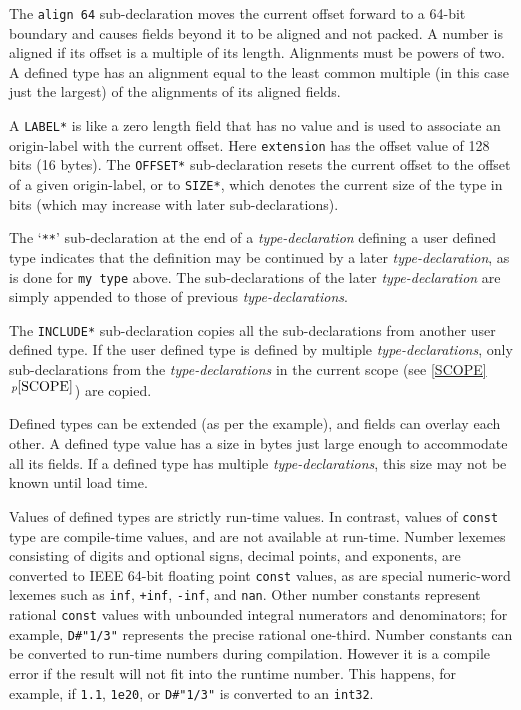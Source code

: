 \documentclass[12pt]{article}
\newcommand{\itemref}[1]{\ref{#1}$\,^{p\pageref{#1}}$}
\begin{document}
The {\tt align 64} sub-declaration moves the current offset
forward to a 64-bit boundary and causes fields beyond it
to be aligned and not packed.  A number is aligned if
its offset is a multiple of its length.  Alignments must be powers of two.
A defined type has an
alignment equal to the least common multiple (in this case just the
largest) of the
alignments of its aligned fields.

A {\tt *LABEL*} is like a zero length field that has no value and
is used to associate an origin-label with the current offset.
Here {\tt extension} has the offset value of 128 bits (16 bytes).
The {\tt *OFFSET*} sub-declaration resets the current offset to the offset
of a given origin-label, or to {\tt *SIZE*}, which denotes the current
size of the type in bits (which may increase with later sub-declarations).

The `{\tt ***}' sub-declaration at the end of a
{\em type-declaration} defining a user defined type indicates
that the definition may be continued by a later {\em type-declaration},
as is done for {\tt my type} above.
The sub-declarations of the later {\em type-declaration} are
simply appended to those of previous {\em type-declarations}.

The {\tt *INCLUDE*} sub-declaration copies all the sub-declarations
from another user defined type.
If the user defined type is
defined by multiple {\em type-declarations}, only sub-declarations
from the {\em type-declarations} in the current scope (see \itemref{SCOPE})
are copied.

Defined types can be extended
(as per the example), and fields can overlay each other.
A defined type value has a size in bytes just large enough to
accommodate all its fields.  If a defined type has multiple
{\em type-declarations}, this size may not be known until load time.

Values of defined types are strictly run-time values.  In contrast,
values of {\tt const} type are compile-time values, and are
not available at run-time.  Number lexemes consisting of
digits and optional signs, decimal points, and exponents,
are converted to IEEE 64-bit floating point {\tt const} values, as are
special numeric-word lexemes such as {\tt inf}, {\tt +inf}, {\tt -inf}, and
{\tt nan}.  Other number constants represent
rational {\tt const} values with unbounded integral numerators
and denominators; for example,
{\tt D\#"1/3"} represents the precise rational one-third.
Number constants
can be converted to run-time numbers during compilation.
However it is a compile error
if the result will not fit into the runtime number.
This happens, for example, if {\tt 1.1}, {\tt 1e20}, or {\tt D\#"1/3"}
is converted to an {\tt int32}.
\end{document}
